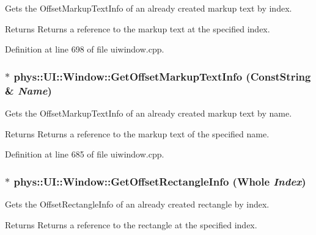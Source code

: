 Gets the OffsetMarkupTextInfo of an already created markup text by index. 

\begin{DoxyReturn}{Returns}
Returns a reference to the markup text at the specified index. 
\end{DoxyReturn}


Definition at line 698 of file uiwindow.cpp.

\hypertarget{classphys_1_1UI_1_1Window_a9906bb131f631af0a9aed7dbb7744112}{
\subsubsection[{GetOffsetMarkupTextInfo}]{ $\ast$ phys::UI::Window::GetOffsetMarkupTextInfo ({\bf ConstString} \& {\em Name})}}
\label{d4/d86/classphys_1_1UI_1_1Window_a9906bb131f631af0a9aed7dbb7744112}


Gets the OffsetMarkupTextInfo of an already created markup text by name. 

\begin{DoxyReturn}{Returns}
Returns a reference to the markup text of the specified name. 
\end{DoxyReturn}


Definition at line 685 of file uiwindow.cpp.

\hypertarget{classphys_1_1UI_1_1Window_a4661554adce63570ae43016f358b2893}{
\subsubsection[{GetOffsetRectangleInfo}]{ $\ast$ phys::UI::Window::GetOffsetRectangleInfo ({\bf Whole} {\em Index})}}
\label{d4/d86/classphys_1_1UI_1_1Window_a4661554adce63570ae43016f358b2893}


Gets the OffsetRectangleInfo of an already created rectangle by index. 

\begin{DoxyReturn}{Returns}
Returns a reference to the rectangle at the specified index. 
\end{DoxyReturn}


